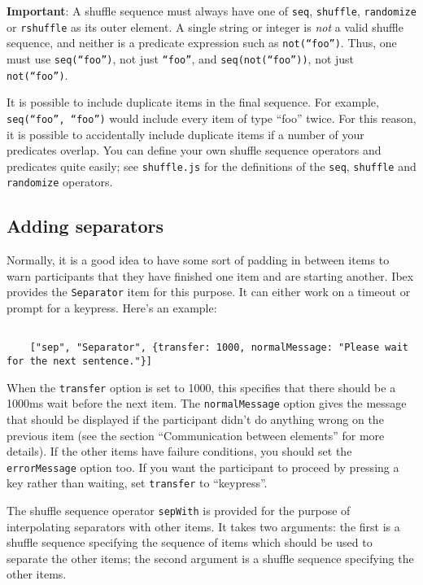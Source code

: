\documentclass[11pt,letterpaper]{article}
\begin{document}
\textbf{Important}: A shuffle sequence must always have one of \texttt{seq}, \texttt{shuffle},
\texttt{randomize} or \texttt{rshuffle} as its outer element. A single string or integer is
\textit{ not}  a valid shuffle sequence, and neither is a predicate expression such as
\texttt{not(``foo'')}. Thus, one must use \texttt{seq(``foo'')}, not just \texttt{``foo''}, and
\texttt{seq(not(``foo''))}, not just \texttt{not(``foo'')}.

It is possible to include duplicate items in the final sequence. For example,
\texttt{seq(``foo'', ``foo'')} would include every item of type ``foo'' twice. For this
reason, it is possible to accidentally include duplicate items if a number of
your predicates overlap.  You can define your own shuffle sequence operators
and predicates quite easily; see \texttt{shuffle.js} for the definitions of the \texttt{seq},
\texttt{shuffle} and \texttt{randomize} operators.

\subsection{Adding separators}

Normally, it is a good idea to have some sort of padding in between items to
warn participants that they have finished one item and are starting another.
Ibex provides the \texttt{Separator} item for this purpose. It can either work on a
timeout or prompt for a keypress. Here's an example:
\footnotesize\begin{verbatim}

    ["sep", "Separator", {transfer: 1000, normalMessage: "Please wait for the next sentence."}]
\end{verbatim}

\smallskip\noindent\normalsize

When the \texttt{transfer} option is set to 1000, this specifies that there should be
a 1000ms wait before the next item. The \texttt{normalMessage} option gives the
message that should be displayed if the participant didn't do anything wrong on
the previous item (see the section ``Communication between elements'' for more
details). If the other items have failure conditions, you should set the
\texttt{errorMessage} option too. If you want the participant to proceed by pressing a
key rather than waiting, set \texttt{transfer} to ``keypress''.

The shuffle sequence operator \texttt{sepWith} is provided for the purpose of
interpolating separators with other items. It takes two arguments: the first is
a shuffle sequence specifying the sequence of items which should be used to
separate the other items; the second argument is a shuffle sequence specifying
the other items.
\end{document}
